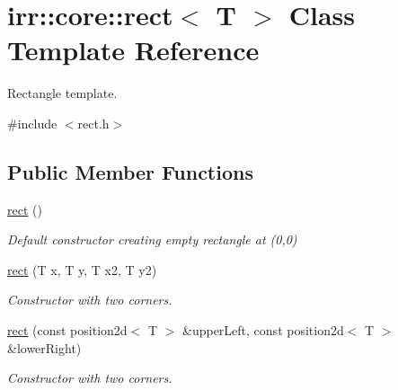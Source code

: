 \hypertarget{classirr_1_1core_1_1rect}{}\section{irr\+:\+:core\+:\+:rect$<$ T $>$ Class Template Reference}
\label{classirr_1_1core_1_1rect}


Rectangle template.  




{\ttfamily \#include $<$rect.\+h$>$}

\subsection*{Public Member Functions}
\begin{DoxyCompactItemize}
\item 
\mbox{\label{classirr_1_1core_1_1rect_a04c79e7af6ff14b62e569628c4f83e44}} 
\hyperlink{classirr_1_1core_1_1rect_a04c79e7af6ff14b62e569628c4f83e44}{rect} ()
\begin{DoxyCompactList}\small\item\em Default constructor creating empty rectangle at (0,0) \end{DoxyCompactList}\item 
\mbox{\label{classirr_1_1core_1_1rect_af7d59f53cd24d5f9f587896160ece50a}} 
\hyperlink{classirr_1_1core_1_1rect_af7d59f53cd24d5f9f587896160ece50a}{rect} (T x, T y, T x2, T y2)
\begin{DoxyCompactList}\small\item\em Constructor with two corners. \end{DoxyCompactList}\item 
\mbox{\label{classirr_1_1core_1_1rect_a8f207109cebad893de44b01cc67e9e34}} 
\hyperlink{classirr_1_1core_1_1rect_a8f207109cebad893de44b01cc67e9e34}{rect} (const position2d$<$ T $>$ \&upper\+Left, const position2d$<$ T $>$ \&lower\+Right)
\begin{DoxyCompactList}\small\item\em Constructor with two corners. \end{DoxyCompactList}\item 
\mbox{\label{classirr_1_1core_1_1rect_a54526b73a11cf90a4f4ff0c6d1556fcc}} 

\end{DoxyCompactItemize}
